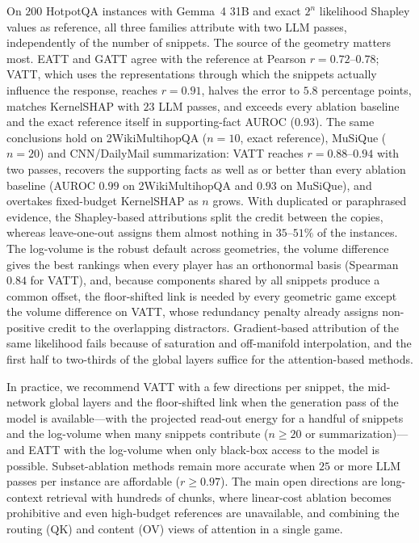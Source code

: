 On $200$ HotpotQA instances with Gemma~4 31B and exact $2^n$ likelihood Shapley values as reference, all three families attribute with two LLM passes, independently of the number of snippets. The source of the geometry matters most. EATT and GATT agree with the reference at Pearson $r = 0.72$--$0.78$; VATT, which uses the representations through which the snippets actually influence the response, reaches $r = 0.91$, halves the error to $5.8$ percentage points, matches KernelSHAP with $23$ LLM passes, and exceeds every ablation baseline and the exact reference itself in supporting-fact AUROC ($0.93$). The same conclusions hold on 2WikiMultihopQA ($n = 10$, exact reference), MuSiQue ($n = 20$) and CNN/DailyMail summarization: VATT reaches $r = 0.88$--$0.94$ with two passes, recovers the supporting facts as well as or better than every ablation baseline (AUROC $0.99$ on 2WikiMultihopQA and $0.93$ on MuSiQue), and overtakes fixed-budget KernelSHAP as $n$ grows. With duplicated or paraphrased evidence, the Shapley-based attributions split the credit between the copies, whereas leave-one-out assigns them almost nothing in $35$--$51\%$ of the instances. The log-volume is the robust default across geometries, the volume difference gives the best rankings when every player has an orthonormal basis (Spearman $0.84$ for VATT), and, because components shared by all snippets produce a common offset, the floor-shifted link is needed by every geometric game except the volume difference on VATT, whose redundancy penalty already assigns non-positive credit to the overlapping distractors. Gradient-based attribution of the same likelihood fails because of saturation and off-manifold interpolation, and the first half to two-thirds of the global layers suffice for the attention-based methods.

In practice, we recommend VATT with a few directions per snippet, the mid-network global layers and the floor-shifted link when the generation pass of the model is available---with the projected read-out energy for a handful of snippets and the log-volume when many snippets contribute ($n \ge 20$ or summarization)--- and EATT with the log-volume when only black-box access to the model is possible. Subset-ablation methods remain more accurate when $25$ or more LLM passes per instance are affordable ($r \ge 0.97$). The main open directions are long-context retrieval with hundreds of chunks, where linear-cost ablation becomes prohibitive and even high-budget references are unavailable, and combining the routing (QK) and content (OV) views of attention in a single game.
